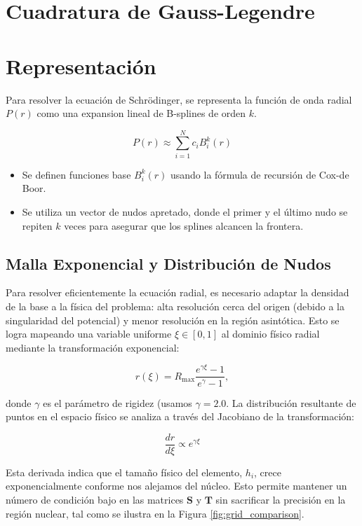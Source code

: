 \section{Cuadratura de Gauss-Legendre}


\section{Representación}

Para resolver la ecuación de Schrödinger, se representa la función de onda radial \( P(r) \) como una expansion lineal de B-splines de orden \( k \).

\[ P(r) \approx \sum_{i=1}^N c_iB_i^k(r) \]

\begin{itemize}
\item Se definen funciones base \( B_i^k(r) \) usando la fórmula de recursión de Cox-de Boor.
\item Se utiliza un vector de nudos apretado, donde el primer y el último nudo se repiten \( k \) veces para asegurar que los splines alcancen la frontera.
\end{itemize}

\subsection{Malla Exponencial y Distribución de Nudos}

Para resolver eficientemente la ecuación radial, es necesario adaptar la densidad de la base a la física del problema: alta resolución cerca del origen (debido a la singularidad del potencial) y menor resolución en la región asintótica. Esto se logra mapeando una variable uniforme $\xi \in [0,1]$ al dominio físico radial mediante la transformación exponencial:

\begin{equation}
\label{eq:exp-grid}
    r(\xi) = R_{\text{max}} \frac{e^{\gamma \xi}-1}{e^{\gamma}-1},
\end{equation}

donde $\gamma$ es el parámetro de rigidez (usamos $\gamma=2.0$. La distribución resultante de puntos en el espacio físico se analiza a través del Jacobiano de la transformación:

\begin{equation}
    \frac{dr}{d\xi} \propto e^{\gamma \xi}
\end{equation}

Esta derivada indica que el tamaño físico del elemento, $h_i$, crece exponencialmente conforme nos alejamos del núcleo. Esto permite mantener un número de condición bajo en las matrices $\mathbf{S}$ y $\mathbf{T}$ sin sacrificar la precisión en la región nuclear, tal como se ilustra en la Figura \cref{fig:grid_comparison}.

